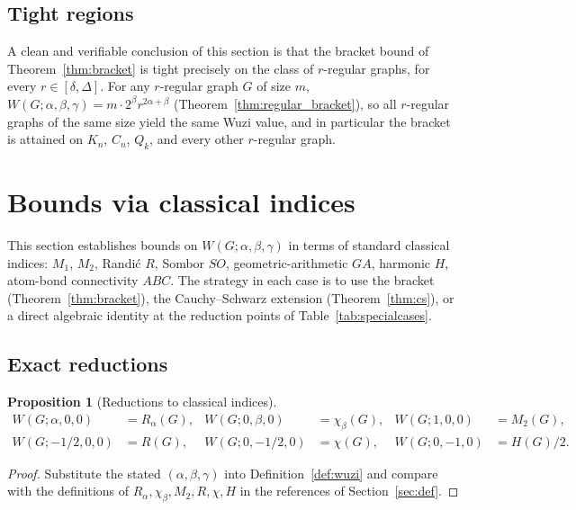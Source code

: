 \documentclass[11pt,a4paper]{article}
\newtheorem{proposition}[theorem]{Proposition}
\theoremstyle{definition}
\newcommand{\Wuzi}{W(G;\alpha,\beta,\gamma)}
\begin{document}
\subsection{Tight regions}

A clean and verifiable conclusion of this section is that the
bracket bound of Theorem~\ref{thm:bracket} is tight precisely on
the class of $r$-regular graphs, for every $r \in [\delta, \Delta]$.
For any $r$-regular graph $G$ of size $m$,
$\Wuzi = m \cdot 2^\beta r^{2\alpha + \beta}$
(Theorem~\ref{thm:regular_bracket}), so all $r$-regular graphs of
the same size yield the same Wuzi value, and in particular the
bracket is attained on $K_n$, $C_n$, $Q_k$, and every other
$r$-regular graph.

\section{Bounds via classical indices}\label{sec:bounds_classical}

This section establishes bounds on $\Wuzi$ in terms of standard
classical indices: $M_1$, $M_2$, Randi\'c $R$, Sombor $SO$,
geometric-arithmetic $GA$, harmonic $H$, atom-bond connectivity
$ABC$. The strategy in each case is to use the bracket
(Theorem~\ref{thm:bracket}), the Cauchy--Schwarz extension
(Theorem~\ref{thm:cs}), or a direct algebraic identity at the
reduction points of Table~\ref{tab:specialcases}.

\subsection{Exact reductions}

\begin{proposition}[Reductions to classical indices]\label{prop:reductions}
\begin{align*}
W(G;\alpha,0,0)&=R_\alpha(G), &
W(G;0,\beta,0)&=\chi_\beta(G), &
W(G;1,0,0)&=M_2(G), \\
W(G;-1/2,0,0)&=R(G), &
W(G;0,-1/2,0)&=\chi(G), &
W(G;0,-1,0)&=H(G)/2.
\end{align*}
\end{proposition}

\begin{proof}
Substitute the stated $(\alpha,\beta,\gamma)$ into
Definition~\ref{def:wuzi} and compare with the definitions of
$R_\alpha, \chi_\beta, M_2, R, \chi, H$ in the references of
Section~\ref{sec:def}.
\end{proof}
\end{document}
